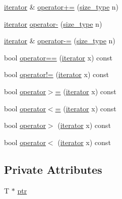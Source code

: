 \begin{DoxyCompactItemize}
\item 
\mbox{\hyperlink{classprevector_1_1iterator}{iterator}} \& \mbox{\hyperlink{classprevector_1_1iterator_a9d6cc2ddeb708d1c9dd4a066403303af}{operator+=}} (\mbox{\hyperlink{classprevector_a7e0da95e6d1c878f6eeb572f4fc12524}{size\+\_\+type}} n)
\item 
\mbox{\hyperlink{classprevector_1_1iterator}{iterator}} \mbox{\hyperlink{classprevector_1_1iterator_a54022e189e5a6229f5c528fa3cc00f29}{operator-\/}} (\mbox{\hyperlink{classprevector_a7e0da95e6d1c878f6eeb572f4fc12524}{size\+\_\+type}} n)
\item 
\mbox{\hyperlink{classprevector_1_1iterator}{iterator}} \& \mbox{\hyperlink{classprevector_1_1iterator_a979c36f0f892be45415f70ca65f325b4}{operator-\/=}} (\mbox{\hyperlink{classprevector_a7e0da95e6d1c878f6eeb572f4fc12524}{size\+\_\+type}} n)
\item 
bool \mbox{\hyperlink{classprevector_1_1iterator_a2c296e13ae8e71c99d9efa6af596fcf8}{operator==}} (\mbox{\hyperlink{classprevector_1_1iterator}{iterator}} x) const
\item 
bool \mbox{\hyperlink{classprevector_1_1iterator_a4a5eb32aaaf5aba9b5cfca4557e02976}{operator!=}} (\mbox{\hyperlink{classprevector_1_1iterator}{iterator}} x) const
\item 
bool \mbox{\hyperlink{classprevector_1_1iterator_a835326570dd75d27fb9a30fd8ba2d1c3}{operator$>$=}} (\mbox{\hyperlink{classprevector_1_1iterator}{iterator}} x) const
\item 
bool \mbox{\hyperlink{classprevector_1_1iterator_a71bcf1e1019bf7329a48791ba6a2f680}{operator$<$=}} (\mbox{\hyperlink{classprevector_1_1iterator}{iterator}} x) const
\item 
bool \mbox{\hyperlink{classprevector_1_1iterator_abf1cd6daede5b7f4fbe6e78f409754c1}{operator$>$}} (\mbox{\hyperlink{classprevector_1_1iterator}{iterator}} x) const
\item 
bool \mbox{\hyperlink{classprevector_1_1iterator_a21c9ead8f23f691204d0e1b58c8de636}{operator$<$}} (\mbox{\hyperlink{classprevector_1_1iterator}{iterator}} x) const
\end{DoxyCompactItemize}
\subsection*{Private Attributes}
\begin{DoxyCompactItemize}
\item 
T $\ast$ \mbox{\hyperlink{classprevector_1_1iterator_ab86fbe848463c1f8dc3e4296262f21ab}{ptr}}
\end{DoxyCompactItemize}


